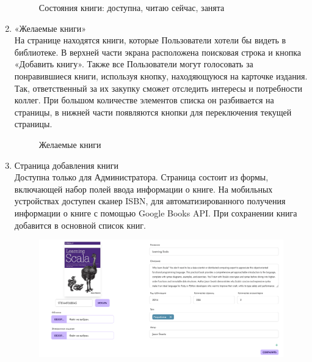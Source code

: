 \documentclass[project.tex]{subfiles}
\begin{document}
\begin{enumerate}
\begin{figure}[H]
       \caption{Состояния книги: доступна, читаю сейчас, занята} 
    \end{figure}
    \item «Желаемые книги»\\
    На странице находятся книги, которые Пользователи хотели бы видеть в библиотеке. В верхней части экрана расположена поисковая строка и кнопка «Добавить книгу». Также все Пользователи могут голосовать за понравившиеся книги, используя кнопку, находяющуюся на карточке издания. Так, ответственный за их закупку сможет отследить интересы и потребности коллег. 
    При большом количестве элементов списка он разбивается на страницы, в нижней части появляются кнопки для переключения текущей страницы.
    \begin{figure}[H]
       \label{pic:desired}
       \caption{Желаемые книги} 
    \end{figure}
    \item Страница добавления книги\\
    Доступна только для Администратора. Страница состоит из формы, включающей набор полей ввода информации о книге. На мобильных устройствах доступен сканер ISBN, для автоматизированного получения информации о книге с помощью Google Books API. При сохранении книга добавится в основной список книг.
    \begin{figure}[H]
       \includegraphics[width=\textwidth, frame]{../../graphics/bookform.png}

\end{figure}
\end{enumerate}
\end{document}
